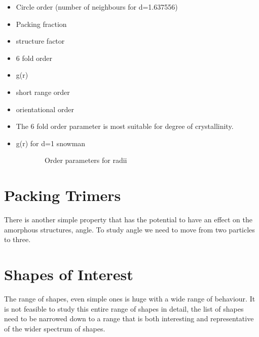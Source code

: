 \begin{itemize}
    \item Circle order (number of neighbours for d=1.637556)
    \item Packing fraction
    \item structure factor
    \item 6 fold order
    \item g(r)
    \item short range order
    \item orientational order
\end{itemize}

\begin{itemize}
    \item The 6 fold order parameter is most suitable for degree of crystallinity.
    \item g(r) for d=1 snowman
\end{itemize}


\begin{figure}
    \begin{subfigure}{0.5\textwidth}
        \caption{Order parameters for radii}
    \end{subfigure}
    \begin{subfigure}{0.5\textwidth}
    \end{subfigure}
\end{figure}

\section{Packing Trimers}
\label{packing trimers}

There is another simple property that has the potential to have an effect on the amorphous structures, angle. To study angle we need to move from two particles to three.

\section{Shapes of Interest}
\label{shapes of interest}

The range of shapes, even simple ones is huge with a wide range of behaviour. It is not feasible to study this entire range of shapes in detail, the list of shapes need to be narrowed down to a range that is both interesting and representative of the wider spectrum of shapes.


